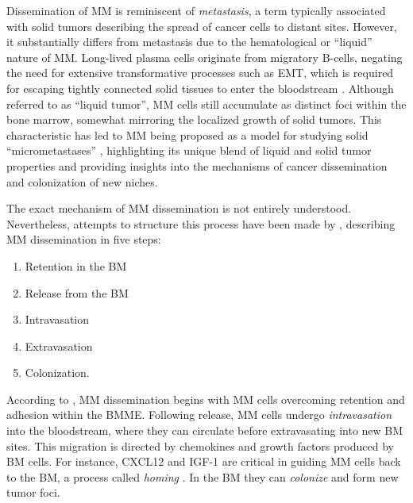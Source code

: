 Dissemination of \ac{MM} is reminiscent of \emph{metastasis}, a
term typically associated with solid tumors describing the spread of cancer
cells to distant sites. However, it substantially differs from metastasis due to
the hematological or ``liquid'' nature of \ac{MM}. Long-lived plasma cells originate
from migratory B-cells, negating the need for extensive transformative processes
such as \ac{EMT}, which is required for
escaping tightly connected solid tissues to enter the bloodstream
\cite{ribattiEpithelialMesenchymalTransitionCancer2020}. Although referred to as
``liquid tumor'', \ac{MM} cells still accumulate as distinct foci within the bone
marrow, somewhat mirroring the localized growth of solid tumors. This
characteristic has led to \ac{MM} being proposed as a model for studying solid
``micrometastases'' \cite{ghobrialMyelomaModelProcess2012}, highlighting its
unique blend of liquid and solid tumor properties and providing insights into
the mechanisms of cancer dissemination and colonization of new niches.

The exact mechanism of \ac{MM} dissemination is not entirely understood.
Nevertheless, attempts to structure this process have been made by
\citet{zeissigTumourDisseminationMultiple2020}, describing \ac{MM} dissemination in
five steps:
\begin{enumerate}
    \item Retention in the \ac{BM}
    \item Release from the \ac{BM}
    \item Intravasation
    \item Extravasation
    \item Colonization.
\end{enumerate}


According to \citet{zeissigTumourDisseminationMultiple2020}, \ac{MM}
dissemination begins with \ac{MM} cells overcoming retention and adhesion within
the \ac{BMME}. Following release, \ac{MM} cells undergo \emph{intravasation}
into the bloodstream, where they can circulate before extravasating into new
\ac{BM} sites. This migration is directed by chemokines and growth factors
produced by \ac{BM} cells. For instance, CXCL12 and IGF-1 are critical in
guiding \ac{MM} cells back to the \ac{BM}, a process called \emph{homing}
\cite{vandebroekExtravasationHomingMechanisms2008}. In the \ac{BM} they can
\emph{colonize} and form new tumor foci.

